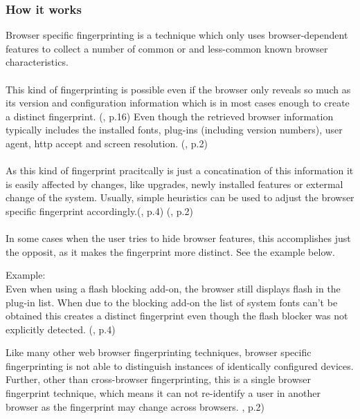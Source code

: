 \subsubsection{How it works}
Browser specific fingerprinting is a technique which only uses browser-dependent features to collect a number of common or and less-common known browser characteristics.\\\\
This kind of fingerprinting is possible even if the browser only reveals so much as its version and configuration information which is in most cases enough to create a distinct fingerprint. (\textcite{eckersley10}, p.16) Even though the retrieved browser information typically includes the installed fonts, plug-ins (including version numbers), user agent, http accept and screen resolution. (\textcite{upi15}, p.2)\\\\
As this kind of fingerprint pracitcally is just a concatination of this information it is easily affected by changes, like upgrades, newly installed features or extermal change of the system.
Usually, simple heuristics can be used to adjust the browser specific fingerprint accordingly.(\textcite{eckersley10}, p.4) (\textcite{upi15}, p.2)\\\\
In some cases when the user tries to hide browser features, this accomplishes just the opposit, as it makes the fingerprint more distinct. See the example below.\\
\begin{tcolorbox}
	Example: \\
	Even when using a flash blocking add-on, the browser still displays flash in the plug-in list. When due to the blocking add-on the list of system fonts can't be obtained this creates a distinct fingerprint even though the flash blocker was not explicitly detected. (\textcite{eckersley10}, p.4)
\end{tcolorbox}
Like many other web browser fingerprinting techniques, browser specific fingerprinting is not able to distinguish instances of identically configured devices. Further, other than cross-browser fingerprinting, this is a single browser fingerprint technique, which means it can not re-identify a user in another browser as the fingerprint may change across browsers. \textcite{upi15}, p.2)

